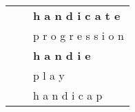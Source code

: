 \documentclass[11pt]{article}
\begin{document}
\begin{spacing}{1}
\begin{table}[!htpb]
\begin{tabular}{p{8cm} l p{5cm}}
                                                                                 &                 & \textbf{h a n d i c a t e}                                                                                                                                                                                                                                                                                                                                                                                               \\
                                                                                 &                 & p r o g r e s s i o n                                                                                                                                                                                                                                                                                                                                                                                           \\
                                                                                 &                 & \textbf{h a n d i e}                                                                                                                                                                                                                                                                                                                                                                                                     \\
                                                                                 &                 & p l a y                                                                                                                                                                                                                                                                                                                                                                                                         \\
                                                                                 &                 & h a n d i c a p                                                                                                                                                                                                                                                                                                                                                                                                 \\

\end{tabular}
\end{table}
\end{spacing}
\end{document}

